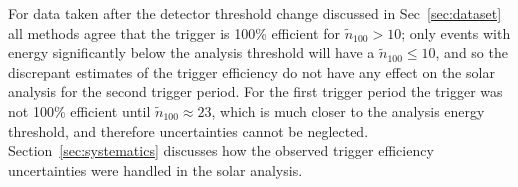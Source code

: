 For data taken after the detector threshold change discussed in Sec~\ref{sec:dataset}
all methods agree that the trigger is 100\% efficient for $\tilde{n}_{100} > 10$;
only events with energy significantly below the analysis threshold 
will have a $\tilde{n}_{100} \le 10$, and so the discrepant
estimates of the trigger
efficiency do not have any effect on the solar analysis for the second trigger period.
For the first trigger period the trigger was not 100\% efficient until
$\tilde{n}_{100} \approx 23$, which is much closer to the analysis energy
threshold, and therefore uncertainties cannot be neglected.
Section~\ref{sec:systematics} discusses how the observed trigger efficiency
uncertainties were handled in the solar analysis.
